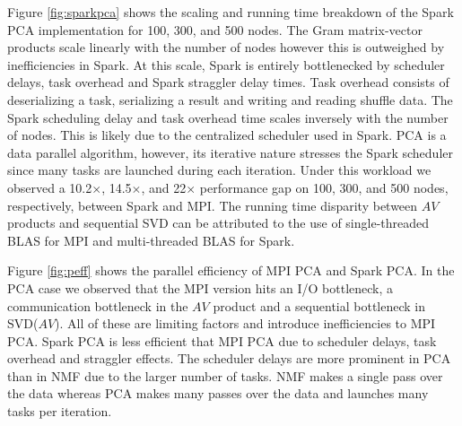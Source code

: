 Figure \ref{fig:sparkpca} shows the scaling and running time breakdown of the Spark PCA implementation for 100, 300, and 500 nodes. The Gram matrix-vector products scale linearly with the number of nodes however this is outweighed by inefficiencies in Spark. At this scale, Spark is entirely bottlenecked by scheduler delays, task overhead and Spark straggler delay times. Task overhead consists of deserializing a task, serializing a result and writing and reading shuffle data. The Spark scheduling delay and task overhead time scales inversely with the number of nodes. This is likely due to the centralized scheduler used in Spark. PCA is a data parallel algorithm, however, its iterative nature stresses the Spark scheduler since many tasks are launched during each iteration. Under this workload we observed a 10.2$\times$, 14.5$\times$, and 22$\times$ performance gap on 100, 300, and 500 nodes, respectively, between Spark and MPI. The running time disparity between $AV$ products and sequential SVD can be attributed to the use of single-threaded BLAS for MPI and multi-threaded BLAS for Spark.

Figure \ref{fig:peff} shows the parallel efficiency of MPI PCA and Spark PCA. In the PCA case we observed that the MPI version hits an I/O bottleneck, a communication bottleneck in the $AV$ product and a sequential bottleneck in SVD($AV$). All of these are limiting factors and introduce inefficiencies to MPI PCA. Spark PCA is less efficient that MPI PCA due to scheduler delays, task overhead and straggler effects. The scheduler delays are more prominent in PCA than in NMF due to the larger number of tasks. NMF makes a single pass over the data whereas PCA makes many passes over the data and launches many tasks per iteration.



